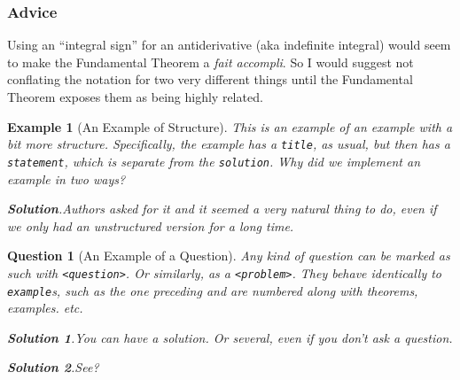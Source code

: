 \documentclass{sn-jnl}
\theoremstyle{thmstyleone}%
\theoremstyle{thmstyletwo}%
\newtheorem{question}[theorem]{Question}
\newtheorem{example}[theorem]{Example}
\theoremstyle{thmstylethree}%
\newcommand{\blocktitlefont}{\relax}
\newcommand{\mono}[1]{\texttt{#1}}
\numberwithin{equation}{section}
\begin{document}
\subsubsection{Advice}\label{section-interesting-corollary-5-3}%
Using an ``integral sign'' for an antiderivative (aka indefinite integral) would seem to make the Fundamental Theorem a \textit{fait accompli}.  So I would suggest not conflating the notation for two very different things until the Fundamental Theorem exposes them as being highly related.%
\begin{example}[An Example of Structure]\label{example-structured}%
%
This is an example of an example with a bit more structure.  Specifically, the example has a \mono{title}, as usual, but then has a \mono{statement}, which is separate from the \mono{solution}.  Why did we implement an example in two ways?%
\par\smallskip%
\noindent\textbf{\blocktitlefont Solution}.\hypertarget{example-structured-3}{}\quad{}Authors asked for it and it seemed a very natural thing to do, even if we only had an unstructured version for a long time.%
\end{example}
\begin{question}[An Example of a Question]\label{sample-question}%
%
Any kind of question can be marked as such with \mono{<question>}.  Or similarly, as a \mono{<problem>}.  They behave identically to \mono{example}s, such as the one preceding and are numbered along with theorems, examples. etc.%
\par\smallskip%
\noindent\textbf{\blocktitlefont Solution 1}.\hypertarget{sample-question-3}{}\quad{}You can have a solution. Or several, even if you don't ask a question.%
\par\smallskip%
\noindent\textbf{\blocktitlefont Solution 2}.\hypertarget{sample-question-4}{}\quad{}See?%
\end{question}
\end{document}
